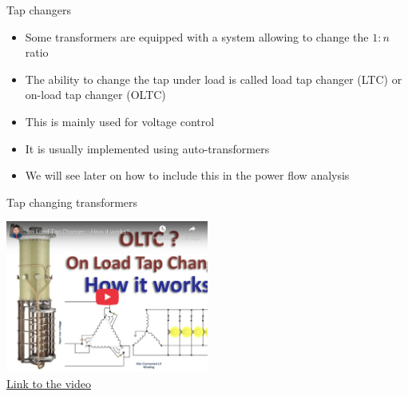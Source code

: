 \begin{frame}{Tap changers}

\begin{itemize}
\item Some transformers are equipped with a system allowing to change the $1:n$ ratio
\item The ability to change the tap under load is called load tap changer (LTC) or on-load tap changer (OLTC)
\item This is mainly used for voltage control
\item It is usually implemented using auto-transformers
\item We will see later on how to include this in the power flow analysis
\end{itemize}
\end{frame}

\begin{frame}{Tap changing transformers}
\begin{center}
    \includegraphics[width=0.5\textwidth]{images/OLTC.png}\\
    \href{https://www.youtube.com/embed/R_NxRDXOEFk}{\underline{Link to the video}}
\end{center}
\end{frame}

